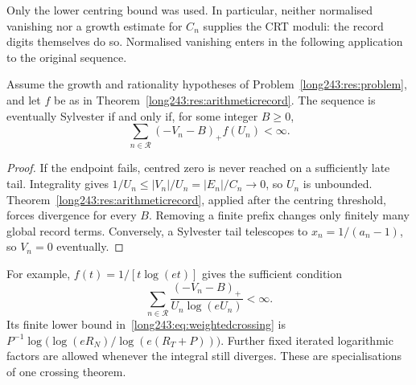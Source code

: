 Only the lower centring bound was used. In particular, neither normalised
vanishing nor a growth estimate for $C_n$ supplies the CRT moduli: the
record digits themselves do so. Normalised vanishing enters in the following
application to the original sequence.

\begin{theorem}\label{long243:res:weightedrecord}
Assume the growth and rationality hypotheses of Problem~\ref{long243:res:problem},
and let $f$ be as in Theorem~\ref{long243:res:arithmeticrecord}. The sequence is
eventually Sylvester if and only if, for some integer $B\ge0$,
\[
 \sum_{n\in\mathcal R}(-V_n-B)_+f(U_n)<\infty.
\]
\end{theorem}

\begin{proof}
If the endpoint fails, centred zero is never reached on a sufficiently late
tail. Integrality gives $1/U_n\le|V_n|/U_n=|E_n|/C_n\to0$, so $U_n$ is
unbounded. Theorem~\ref{long243:res:arithmeticrecord}, applied after the centring
threshold, forces divergence for every $B$. Removing a finite prefix changes
only finitely many global record terms. Conversely, a Sylvester tail
telescopes to $x_n=1/(a_n-1)$, so $V_n=0$ eventually.
\end{proof}

For example, $f(t)=1/[t\log(et)]$ gives the sufficient condition
\[
 \sum_{n\in\mathcal R}\frac{(-V_n-B)_+}{U_n\log(eU_n)}<\infty.
\]
Its finite lower bound in~\eqref{long243:eq:weightedcrossing} is
$P^{-1}\log\bigl(\log(eR_N)/\log(e(R_T+P))\bigr)$.
Further fixed iterated logarithmic factors are allowed whenever the integral
still diverges. These are specialisations of one crossing theorem.

